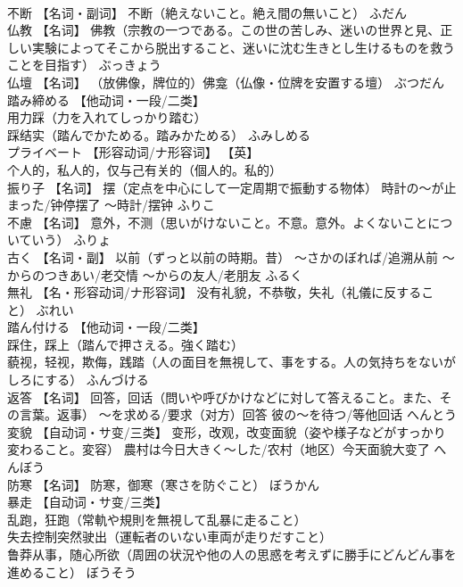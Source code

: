 \documentclass[8pt]{extreport}
\begin{document}
\begin{CJK}{UTF8}{min}
\\	不断	【名词・副词】 不断（絶えないこと。絶え間の無いこと）	ふだん	
\\	仏教	【名词】 佛教（宗教の一つである。この世の苦しみ、迷いの世界と見、正しい実験によってそこから脱出すること、迷いに沈む生きとし生けるものを救うことを目指す）	ぶっきょう	
\\	仏壇	【名词】 （放佛像，牌位的）佛龛（仏像・位牌を安置する壇）	ぶつだん	
\\	踏み締める	【他动词・一段/二类】 
\\	用力踩（力を入れてしっかり踏む） 
\\	踩结实（踏んでかためる。踏みかためる）	ふみしめる	
\\	プライベート	【形容动词/ナ形容词】 【英】
\\	个人的，私人的，仅与己有关的（個人的。私的）		
\\	振り子	【名词】 摆（定点を中心にして一定周期で振動する物体） 時計の～が止まった/钟停摆了 ～時計/摆钟	ふりこ	
\\	不慮	【名词】 意外，不测（思いがけないこと。不意。意外。よくないことについていう）	ふりょ	
\\	古く	【名词・副】 以前（ずっと以前の時期。昔） ～さかのぼれば/追溯从前 ～からのつきあい/老交情 ～からの友人/老朋友	ふるく	
\\	無礼	【名・形容动词/ナ形容词】 没有礼貌，不恭敬，失礼（礼儀に反すること）	ぶれい	
\\	踏ん付ける	【他动词・一段/二类】 
\\	踩住，踩上（踏んで押さえる。強く踏む） 
\\	藐视，轻视，欺侮，践踏（人の面目を無視して、事をする。人の気持ちをないがしろにする）	ふんづける	
\\	返答	【名词】 回答，回话（問いや呼びかけなどに対して答えること。また、その言葉。返事） ～を求める/要求（对方）回答 彼の～を待つ/等他回话	へんとう	
\\	変貌	【自动词・サ变/三类】 变形，改观，改变面貌（姿や様子などがすっかり変わること。変容） 農村は今日大きく～した/农村（地区）今天面貌大变了	へんぼう	
\\	防寒	【名词】 防寒，御寒（寒さを防ぐこと）	ぼうかん	
\\	暴走	【自动词・サ变/三类】 
\\	乱跑，狂跑（常軌や規則を無視して乱暴に走ること） 
\\	失去控制突然驶出（運転者のいない車両が走りだすこと） 
\\	鲁莽从事，随心所欲（周囲の状況や他の人の思惑を考えずに勝手にどんどん事を進めること）	ぼうそう	

\end{CJK}
\end{document}
